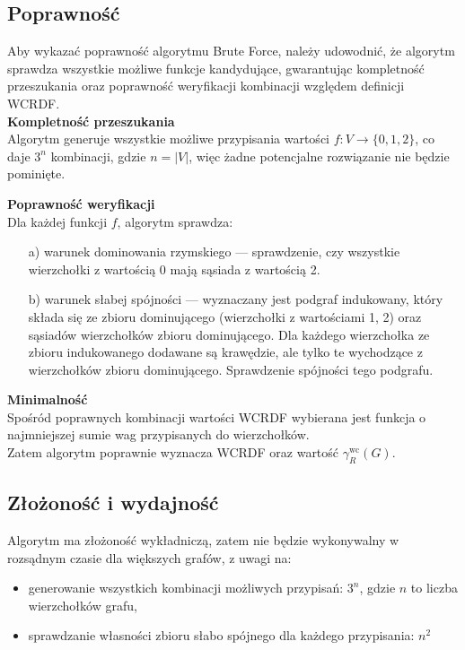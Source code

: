 \subsection{Poprawność}
\label{subsec:bf_poprawnosc}

Aby wykazać poprawność algorytmu Brute Force, należy udowodnić, że algorytm sprawdza wszystkie możliwe funkcje kandydujące, gwarantując kompletność przeszukania oraz poprawność weryfikacji kombinacji względem definicji WCRDF.\\

\textbf{Kompletność przeszukania}\\
Algorytm generuje wszystkie możliwe przypisania wartości $f: V \to \{0,1,2\}$, co daje $3^n$ kombinacji, gdzie $n = |V|$, więc żadne potencjalne rozwiązanie nie będzie pominięte.

\textbf{Poprawność weryfikacji}\\
Dla każdej funkcji $f$, algorytm sprawdza:

\begin{itemize}
    \item[a)] warunek dominowania rzymskiego — sprawdzenie, czy wszystkie wierzchołki z wartością 0 mają sąsiada z wartością 2.
    
    \item[b)] warunek słabej spójności — wyznaczany jest podgraf indukowany, który składa się ze zbioru dominującego (wierzchołki z wartościami {1, 2}) oraz sąsiadów wierzchołków zbioru dominującego. Dla każdego wierzchołka ze zbioru indukowanego dodawane są krawędzie, ale tylko te wychodzące z wierzchołków zbioru dominującego. Sprawdzenie spójności tego podgrafu.
\end{itemize}

\textbf{Minimalność}\\
Spośród poprawnych kombinacji wartości WCRDF wybierana jest funkcja o najmniejszej sumie wag przypisanych do wierzchołków.\\

Zatem algorytm poprawnie wyznacza WCRDF oraz wartość $\gamma^{\text{wc}}_R(G)$.

\subsection{Złożoność i wydajność}

Algorytm ma złożoność wykładniczą, zatem nie będzie wykonywalny w rozsądnym czasie dla większych grafów, z uwagi na:
\begin{itemize}
    \item generowanie wszystkich kombinacji możliwych przypisań: $3^n$, gdzie $n$ to liczba wierzchołków grafu,
    \item sprawdzanie własności zbioru słabo spójnego dla każdego przypisania: $n^2$
\end{itemize}

